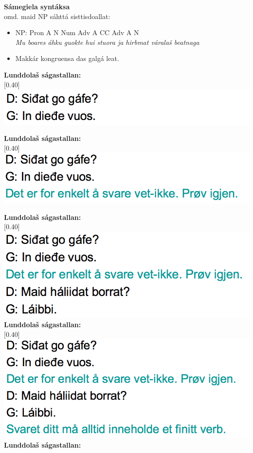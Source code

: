 \documentclass[landscape,norsk,11pt]{seminar}
\begin{document}
\begin{slide}
\newslide
\textbf{Sámegiela syntáksa}\\
omd. maid NP sáhttá sisttisdoallat:
\begin{itemize}
\item \small{NP: Pron A N Num Adv A CC Adv A N}  \\ 	
\textit{Mu boares áhku guokte hui stuora ja hirbmat váralaš beatnaga}	
\item Makkár kongruensa das galgá leat.
\end{itemize}



\newslide
\textbf{Lunddolaš ságastallan:} \\

\scalebox{0.40}[0.40]{\includegraphics{img/lgiella1.png}} 

\newslide
\textbf{Lunddolaš ságastallan:} \\

\scalebox{0.40}[0.40]{\includegraphics{img/lgiella2.png}} 

\newslide
\textbf{Lunddolaš ságastallan:} \\

\scalebox{0.40}[0.40]{\includegraphics{img/lgiella3.png}} 
\newslide
\textbf{Lunddolaš ságastallan:} \\

\scalebox{0.40}[0.40]{\includegraphics{img/lgiella4.png}} 
\newslide
\textbf{Lunddolaš ságastallan:} \\


\end{slide}
\end{document}
